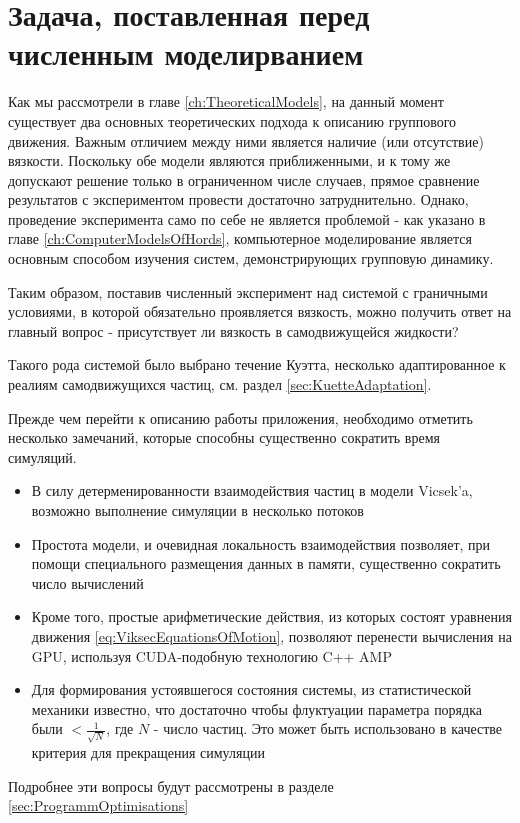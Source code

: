 \section{Задача, поставленная перед численным моделирванием} %
\label{sec:MotivationForProgramm}
    Как мы рассмотрели в главе \ref{ch:TheoreticalModels}, на данный момент существует два основных теоретических подхода к описанию группового движения. Важным отличием между ними является наличие (или отсутствие) вязкости. Поскольку обе модели являются приближенными, и к тому же допускают решение только в ограниченном числе случаев, прямое сравнение результатов с экспериментом провести достаточно затруднительно. Однако, проведение эксперимента само по себе не является проблемой - как указано в главе \ref{ch:ComputerModelsOfHords}, компьютерное моделирование является основным способом изучения систем, демонстрирующих групповую динамику.

    Таким образом, поставив численный эксперимент над системой с граничными условиями, в которой обязательно проявляется вязкость, можно получить ответ на главный вопрос - присутствует ли вязкость в самодвижущейся жидкости?

    Такого рода системой было выбрано течение Куэтта, несколько адаптированное к реалиям самодвижущихся частиц, см. раздел \ref{sec:KuetteAdaptation}.

    Прежде чем перейти к описанию работы приложения, необходимо отметить несколько замечаний, которые способны существенно сократить время симуляций.

    \begin{itemize}
        \item В силу детерменированности взаимодействия частиц в модели Vicsek'a, возможно выполнение симуляции в несколько потоков
        \item Простота модели, и очевидная локальность взаимодействия позволяет, при помощи специального размещения данных в памяти, существенно сократить число вычислений
        \item Кроме того, простые арифметические действия, из которых состоят уравнения движения \ref{eq:ViksecEquationsOfMotion}, позволяют перенести вычисления на GPU, используя CUDA-подобную технологию C++ AMP
        \item Для формирования устоявшегося состояния системы, из статистической механики известно, что достаточно чтобы флуктуации параметра порядка были $< \frac {1}{\sqrt{N}}$, где $N$ - число частиц. Это может быть использовано в качестве критерия для прекращения симуляции
    \end{itemize}

    Подробнее эти вопросы будут рассмотрены в разделе \ref{sec:ProgrammOptimisations}
